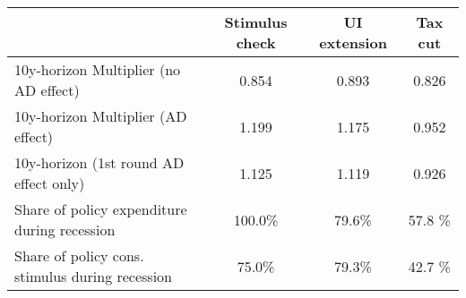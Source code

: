 \begin{tabular}{@{}lccc@{}} 
\toprule 
& Stimulus check    & UI extension    & Tax cut     \\  \midrule 
10y-horizon Multiplier (no AD effect) &0.854  & 0.893  & 0.826     \\ 
10y-horizon Multiplier (AD effect) &1.199  & 1.175  & 0.952     \\ 
10y-horizon (1st round AD effect only) &1.125  & 1.119  & 0.926     \\ 
Share of policy expenditure during recession &100.0\%  & 79.6\%  & 57.8 \%    \\ 
Share of policy cons. stimulus during recession &75.0\%  & 79.3\%  & 42.7 \%    \\ \bottomrule
\end{tabular}  

